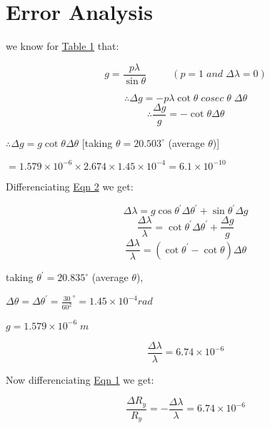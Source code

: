 \section{Error Analysis}

    we know for \hyperref[tab:1]{Table 1} that:

    $$g = \frac{p\lambda}{\sin\theta} \;\;\;\;\;\;\;\;\;(p = 1\;and\;\Delta\lambda = 0)$$
    
    $$\therefore \Delta g = -p\lambda \cot\theta\;cosec\;\theta\;\Delta \theta$$
    $$\therefore \frac{\Delta g}{g} = - \cot\theta\Delta \theta$$


    $\therefore \Delta g = g \cot\theta\Delta \theta$ \hspace{2mm} [taking $\theta = 20.503^\circ$ (average $\theta$)]
    
    \hspace{3mm}
    $= 1.579\times 10^{-6} \times 2.674 \times 1.45 \times 10^{-4} = 6.1\times 10^{-10}$
    \begin{center}\end{center}
    



    Differenciating \hyperref[eqn:2]{Eqn 2} we get:

    $$\Delta\lambda = g\cos\theta^{'}\Delta\theta^{'} + \sin\theta^{'}\Delta g$$
    $$\frac{\Delta\lambda}{\lambda} = \cot\theta^{'}\Delta\theta^{'} + \frac{\Delta g}{g}$$
    $$\frac{\Delta\lambda}{\lambda} =  (\cot\theta^{'}-\cot\theta)\Delta\theta$$

    taking $\theta^{'} = 20.835^\circ$ (average $\theta$),
    
    \hspace{1cm} $\Delta \theta = \Delta \theta^{'}= \frac{30}{60^2}^\circ = 1.45\times 10^{-4} rad$
    
    \hspace{1cm} $g = 1.579 \times 10^{-6}\;m$

    $$
    \frac{\Delta\lambda}{\lambda} = 6.74\times 10^{-6}
    $$

    Now differenciating \hyperref[eqn:1]{Eqn 1} we get:

    $$\frac{\Delta R_y}{R_y} = -\frac{\Delta \lambda}{\lambda} = 6.74\times 10^{-6}$$

    \begin{center}\end{center}

